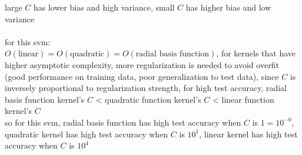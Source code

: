 \documentclass[12pt, border = 4pt, multi]{article} %
\begin{document}
large $C$ has lower bias and high variance, small $C$ has higher bias and low variance\\
\\
for this svm:\\
$O(\text{linear}) = O(\text{quadratic}) = O(\text{radial basis function})$, for kernels that have higher asymptotic complexity, more regularization is needed to avoid overfit (good performance on training data, poor generalization to test data), since $C$ is inversely proportional to regularization strength, for high test accuracy, radial basis function kernel's $C$ < quadratic function kernel's $C$ < linear function kernel's $C$\\
so for this svm, radial basis function has high test accuracy when $C$ is $1 = 10 ^ {-0}$, quadratic kernel has high test accuracy when $C$ is $10 ^ 1$, linear kernel has high test accuracy when $C$ is $10 ^ 4$\\
\end{document}
